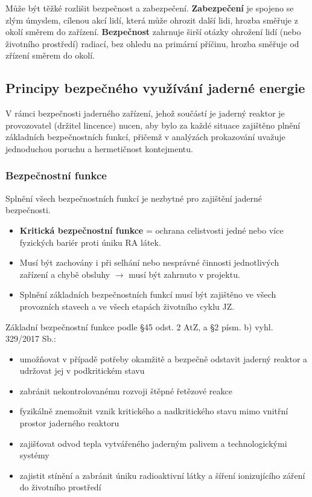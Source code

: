 Může být těžké rozlišit bezpečnost a zabezpečení. \textbf{Zabezpečení} je spojeno se zlým úmyslem, cílenou akcí lidí, která může ohrozit další lidi, hrozba směřuje z okolí směrem do zařízení. \textbf{Bezpečnost} zahrnuje širší otázky ohrožení lidí (nebo životního prostředí) radiací, bez ohledu na primární příčinu, hrozba směřuje od zřízení směrem do okolí.

\subsection{Principy bezpečného využívání jaderné energie}

V rámci bezpečnosti jaderného zařízení, jehož součástí je jaderný reaktor je provozovatel (držitel lincence) nucen, aby bylo za každé situace zajištěno plnění základních bezpečnostních funkcí, přičemž v analýzách prokazování uvažuje jednoduchou poruchu a hermetičnost kontejmentu.

\subsubsection{Bezpečnostní funkce}

Splnění všech bezpečnostních funkcí je nezbytné pro zajištění jaderné bezpečnosti.

\begin{itemize}
    \item \textbf{Kritická bezpečnostní funkce} = ochrana celistvosti jedné nebo více fyzických bariér proti úniku RA látek.
    \item Musí být zachovány i při selhání nebo nesprávné činnosti jednotlivých zařízení a chybě obsluhy $\rightarrow$ musí být zahrnuto v projektu.
    \item Splnění základních bezpečnostních funkcí musí být zajištěno ve všech provozních stavech a ve všech etapách
    životního cyklu JZ.
\end{itemize}

Základní bezpečnostní funkce podle §45 odst. 2 AtZ, a §2 písm. b) vyhl. 329/2017 Sb.:

\begin{itemize}
        \item umožňovat v případě potřeby okamžitě a bezpečně odstavit jaderný reaktor a udržovat jej v podkritickém stavu
        \item zabránit nekontrolovanému rozvoji štěpné řetězové reakce
        \item fyzikálně znemožnit vznik kritického a nadkritického stavu mimo vnitřní prostor jaderného reaktoru
        \item zajišťovat odvod tepla vytvářeného jaderným palivem a technologickými systémy
        \item zajistit stínění a zabránit úniku radioaktivní látky a šíření ionizujícího záření do životního prostředí
    \end{itemize}

